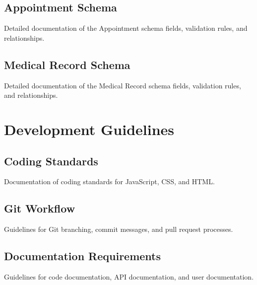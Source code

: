 \documentclass[12pt,a4paper]{report}
\begin{document}
\section{Appointment Schema}
Detailed documentation of the Appointment schema fields, validation rules, and relationships.

\section{Medical Record Schema}
Detailed documentation of the Medical Record schema fields, validation rules, and relationships.

\chapter{Development Guidelines}

\section{Coding Standards}
Documentation of coding standards for JavaScript, CSS, and HTML.

\section{Git Workflow}
Guidelines for Git branching, commit messages, and pull request processes.

\section{Documentation Requirements}
Guidelines for code documentation, API documentation, and user documentation.



\end{document}
